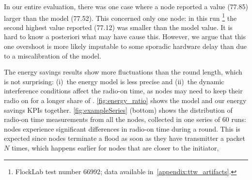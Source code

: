 In our entire evaluation, there was one case where a node reported a value (77.85\ms) larger than the model (77.52\ms). This concerned only one node: in this run%
\footnote{FlockLab test number 66992; data available in~\cref{appendix:ttw_artifacts}.}
the second highest value reported (77.12\ms) was smaller than the model value.
It is hard to know a posteriori what may have cause this.
However, we argue that this one overshoot is more likely imputable to some sporadic hardware delay than due to a miscalibration of the model.


The energy savings results show more fluctuations than the round length, which is not surprising: (i)~the energy model is less precise and (ii)~the dynamic interference conditions affect the radio-on time, as nodes may need to keep their radio on for a longer share of \Tglossy.
\cref{fig:energy_ratio} shows the model and our energy savings KPIs together.
\cref{fig:exampleSeries} (bottom) shows the distribution of radio-on time measurements from all the nodes, collected in one series of 60 runs: nodes experience significant differences in radio-on time during a round. This is expected since nodes terminate a flood as soon as they have transmitter a packet $N$ times, which happens earlier for nodes that are closer to the initiator,

